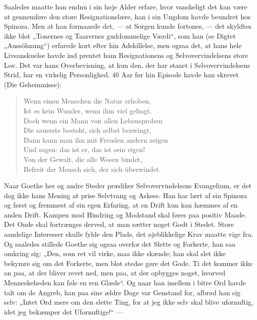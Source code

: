\documentclass[12pt,a4paper,openany]{book}
\newcommand{\opage}[1]{\marginnote{\footnotesize\textit{[#1]}}}
\begin{document}
Saaledes maatte han endnu i sin høje Alder erfare, hvor
vanskeligt det kan være at gennemføre den store Resignationslære,
han i sin Ungdom havde beundret hos Spinoza. Men at
han formaaede det, --- at Sorgen kunde fortones, --- det skyldtes
ikke blot „Tonernes og Taarernes guddommelige Værdi“,
som han (se Digtet „Aussöhnung“) erfarede kort efter hin Adskillelse,
men ogsaa det, at hans hele Livsanskuelse havde ind%
\setcounter{footnote}{0}%
\opage{168}prentet ham Resignationens og Selvovervindelsens store Lov.
Det var hans Overbevisning, at kun den, der har staaet i Selvovervindelsens
Strid, har en virkelig Personlighed. 40 Aar før
hin Episode havde han skrevet (Die Geheimnisse):

\begin{quote}
Wenn einen Menschen die Natur erhoben,\\
Ist es kein Wunder, wenn ihm viel gelingt.\\
Doch wenn ein Mann von allen Lebensproben\\
Die sauerste besteht, sich selbst bezwingt,\\
Dann kann man ihn mit Freuden andern zeigen\\
Und sagen: das ist er, das ist sein eigen!\\
Von der Gewalt, die alle Wesen bindet,\\
Befreit der Mensch sich, der sich überwindet.
\end{quote}

Naar Goethe her og andre Steder prædiker Selvovervindelsens
Evangelium, er det dog ikke hans Mening at prise Selvtvang
og Askese. Han har lært af sin Spinoza og først og
fremmest af sin egen Erfaring, at en Drift kun kan hæmmes
af en anden Drift. Kampen mod Hindring og Modstand skal
føres paa positiv Maade. Det Onde skal fortrænges derved, at
man sætter noget Godt i Stedet. Store aandelige Interesser skulle
fylde den Plads, det øjeblikkelige Krav maatte vige fra. Og
saaledes stillede Goethe sig ogsaa overfor det Slette og Forkerte,
han saa omkring sig: „Den, som ret vil virke, maa ikke
skænde; han skal slet ikke bekymre sig om det Forkerte, men
blot stedse gøre det Gode. Ti det kommer ikke an paa, at der
bliver revet ned, men paa, at der opbygges noget, hvorved
Menneskeheden kan føle en ren Glæde“. Og naar han imellem
i bitre Ord havde talt om de Angreb, han paa sine ældre
Dage var Genstand for, afbrød han sig selv: „Intet Ord mere
om den slette Ting, for at jeg ikke selv skal blive ufornuftig,
idet jeg bekæmper det Ufornuftige!“ ---
\end{document}
